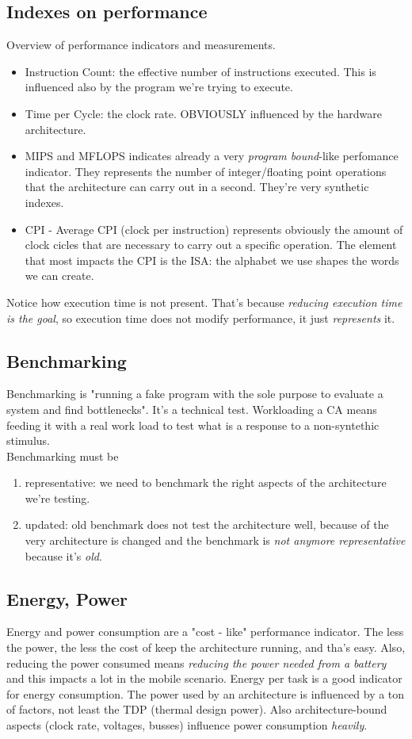 \documentclass[10pt,a4paper]{article}
\begin{document}
			\subsection{Indexes on performance}
				Overview of performance indicators and measurements.
				\begin{itemize}
					\item Instruction Count: the effective number of instructions executed. This is influenced also by the program we're trying to execute.
					\item Time per Cycle: the clock rate. OBVIOUSLY influenced by the hardware architecture.
					\item MIPS and MFLOPS indicates already a very \emph{program bound}-like perfomance indicator. They represents the number of integer/floating point operations that the architecture can carry out in a second. They're very synthetic indexes.
					\item CPI - Average CPI (clock per instruction) represents obviously the amount of clock cicles that are necessary to carry out a specific operation. The element that most impacts the CPI is the ISA: the alphabet we use shapes the words we can create. 
				\end{itemize}
				Notice how execution time is not present. That's because \emph{reducing execution time is the goal}, so execution time does not modify performance, it just \emph{represents} it. 
			
			\subsection{Benchmarking}
				Benchmarking is "running a fake program with the sole purpose to evaluate a system and find bottlenecks". It's a technical test. Workloading a CA means feeding it with a real work load to test what is a response to a non-syntethic stimulus.\\
				Benchmarking must be
				\begin{enumerate}
					\item representative: we need to benchmark the right aspects of the architecture we're testing.
					\item updated: old benchmark does not test the architecture well, because of the very architecture is changed and the benchmark is \emph{not anymore representative} because it's \emph{old}.
				\end{enumerate}
			
			\subsection{Energy, Power}
				Energy and power consumption are a "cost - like" performance indicator. The less the power, the less the cost of keep the architecture running, and tha's easy. Also, reducing the power consumed means \emph{reducing the power needed from a battery} and this impacts a lot in the mobile scenario. Energy per task is a good indicator for energy consumption. The power used by an architecture is influenced by a ton of factors, not least the TDP (thermal design power). Also architecture-bound aspects (clock rate, voltages, busses) influence power consumption \emph{heavily}.
\end{document}
